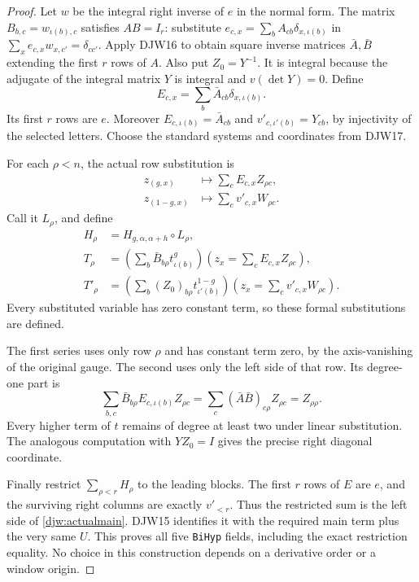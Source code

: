\documentclass[11pt,a4paper]{article}
\numberwithin{equation}{section}
\theoremstyle{remark}\newtheorem{remark}[theorem]{Remark}
\begin{document}
\begin{proof}
Let $w$ be the integral right inverse of $e$ in the normal form.
The matrix $B_{b,c}=w_{\iota(b),c}$ satisfies $AB=I_r$:
substitute $e_{c,x}=\sum_bA_{cb}\delta_{x,\iota(b)}$ in
$\sum_xe_{c,x}w_{x,c'}=\delta_{cc'}$.
Apply DJW16 to obtain square inverse matrices $\bar A,\bar B$
extending the first $r$ rows of $A$.
Also put $Z_0=Y^{-1}$.  It is integral because the adjugate of
the integral matrix $Y$ is integral and $v(\det Y)=0$.
Define
\[
 E_{c,x}=\sum_b\bar A_{cb}\delta_{x,\iota(b)}.
\]
Its first $r$ rows are $e$.  Moreover
$E_{c,\iota(b)}=\bar A_{cb}$ and
$v'_{c,\iota'(b)}=Y_{cb}$, by injectivity of the selected letters.
Choose the standard systems and coordinates from DJW17.

For each $\rho<n$, the actual row substitution is
\begin{align*}
 z_{(g,x)}&\longmapsto\sum_cE_{c,x}Z_{\rho c},\\
 z_{(1-g,x)}&\longmapsto\sum_cv'_{c,x}W_{\rho c}.
\end{align*}
Call it $L_\rho$, and define
\begin{align*}
 H_\rho&=H_{g,\alpha,\alpha+h}\circ L_\rho,\\
 T_\rho&=
 \left(\sum_b\bar B_{b\rho}t^g_{\iota(b)}\right)
       \left(z_x=\sum_cE_{c,x}Z_{\rho c}\right),\\
 T'_\rho&=
 \left(\sum_b(Z_0)_{b\rho}t^{1-g}_{\iota'(b)}\right)
       \left(z_x=\sum_cv'_{c,x}W_{\rho c}\right).
\end{align*}
Every substituted variable has zero constant term, so these formal
substitutions are defined.

The first series uses only row $\rho$ and has constant term zero,
by the axis-vanishing of the original gauge.  The second uses only
the left side of that row.  Its degree-one part is
\[
 \sum_{b,c}\bar B_{b\rho}E_{c,\iota(b)}Z_{\rho c}
       =\sum_c(\bar A\bar B)_{c\rho}Z_{\rho c}
       =Z_{\rho\rho}.
\]
Every higher term of $t$ remains of degree at least two under
linear substitution.  The analogous computation with $YZ_0=I$
gives the precise right diagonal coordinate.

Finally restrict $\sum_{\rho<r}H_\rho$ to the leading blocks.
The first $r$ rows of $E$ are $e$, and the surviving right
columns are exactly $v'_{<r}$.  Thus the restricted sum is the
left side of \eqref{djw:actualmain}.  DJW15 identifies it with
the required main term plus the very same $U$.
This proves all five \texttt{Bi\allowbreak Hyp} fields, including the exact
restriction equality.  No choice in this construction depends
on a derivative order or a window origin.
\end{proof}
\end{document}

